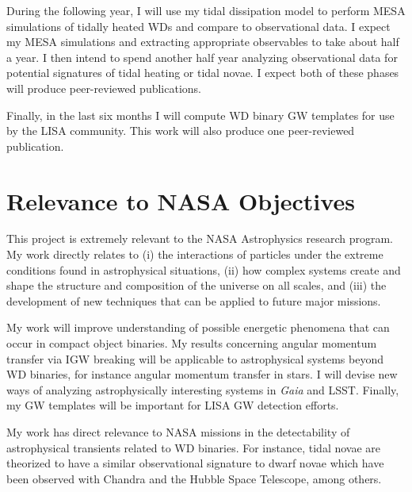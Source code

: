 \documentclass[12pt,
        usenames, %
        dvipsnames %
    ]{article}
\begin{document}
During the following year, I will use my tidal dissipation model to perform MESA
simulations of tidally heated WDs and compare to observational data. I expect my
MESA simulations and extracting appropriate observables to take about half a
year. I then intend to spend another half year analyzing observational data for
potential signatures of tidal heating or tidal novae. I expect both of these
phases will produce peer-reviewed publications.

Finally, in the last six months I will compute WD binary GW templates for use by
the LISA community. This work will also produce one peer-reviewed publication.

\section{Relevance to NASA Objectives}

This project is extremely relevant to the NASA Astrophysics research program.
My work directly relates to (i) the interactions of particles under the extreme
conditions found in astrophysical situations, (ii) how complex systems create
and shape the structure and composition of the universe on all scales, and (iii)
the development of new techniques that can be applied to future major missions.

My work will improve understanding of possible energetic phenomena that can
occur in compact object binaries. My results concerning angular momentum
transfer via IGW breaking will be applicable to astrophysical systems beyond WD
binaries, for instance angular momentum transfer in stars\cite{l_trans_rev}. I
will devise new ways of analyzing astrophysically interesting systems in
\emph{Gaia} and LSST\@. Finally, my GW templates will be important for LISA GW
detection efforts.

My work has direct relevance to NASA missions in the detectability of
astrophysical transients related to WD binaries. For instance, tidal novae are
theorized to have a similar observational signature to dwarf novae which have
been observed with Chandra and the Hubble Space Telescope, among others.

\printbibliography
\end{document}
